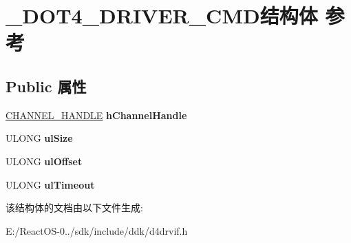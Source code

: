 \hypertarget{struct___d_o_t4___d_r_i_v_e_r___c_m_d}{}\section{\+\_\+\+D\+O\+T4\+\_\+\+D\+R\+I\+V\+E\+R\+\_\+\+C\+M\+D结构体 参考}
\label{struct___d_o_t4___d_r_i_v_e_r___c_m_d}
\subsection*{Public 属性}
\begin{DoxyCompactItemize}
\item 
\mbox{\label{struct___d_o_t4___d_r_i_v_e_r___c_m_d_a88bcac21020e3512c76ef00613782c54}} 
\hyperlink{struct_c_h_a_n_n_e_l___h_a_n_d_l_e__}{C\+H\+A\+N\+N\+E\+L\+\_\+\+H\+A\+N\+D\+LE} {\bfseries h\+Channel\+Handle}
\item 
\mbox{\label{struct___d_o_t4___d_r_i_v_e_r___c_m_d_a43e8c9d54b6e5414b641d53641a6baee}} 
U\+L\+O\+NG {\bfseries ul\+Size}
\item 
\mbox{\label{struct___d_o_t4___d_r_i_v_e_r___c_m_d_a53f8d256ffe12eaeb35d81671b4957f9}} 
U\+L\+O\+NG {\bfseries ul\+Offset}
\item 
\mbox{\label{struct___d_o_t4___d_r_i_v_e_r___c_m_d_a087b9622d13f431e96faf62933cdb4a8}} 
U\+L\+O\+NG {\bfseries ul\+Timeout}
\end{DoxyCompactItemize}


该结构体的文档由以下文件生成\+:\begin{DoxyCompactItemize}
\item 
E\+:/\+React\+O\+S-\/0../sdk/include/ddk/d4drvif.\+h\end{DoxyCompactItemize}
